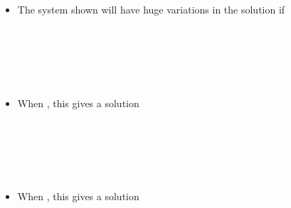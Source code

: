 \documentclass[11pt]{article}
\begin{document}
\begin{itemize}
\begin{itemize}
		 \\\\
		\\\\
	
	\item The system shown will have huge variations in the solution if \\\\
	
		 \\\\
		\\\\
	\item When , this gives a solution 	\\\\
	
	 \\\\
		\\\\
	\item When , this gives a solution 	

\end{itemize}
%
\end{itemize}


	
\end{document}
